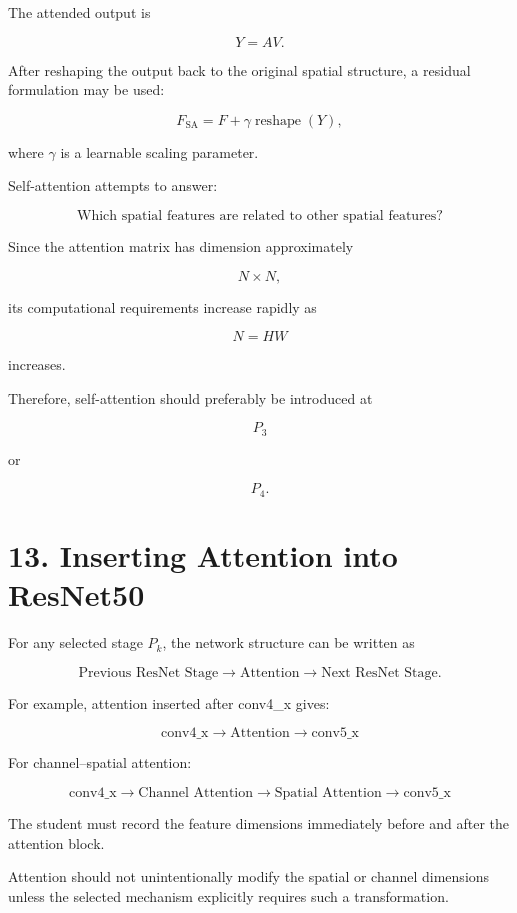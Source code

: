 \documentclass[10pt]{article}
\begin{document}
The attended output is

\[
Y=AV.
\]

After reshaping the output back to the original spatial structure, a residual
formulation may be used:

\[
F_{\mathrm{SA}}
=
F
+
\gamma
\operatorname{reshape}(Y),
\]

where $\gamma$ is a learnable scaling parameter.

Self-attention attempts to answer:

\[
\boxed{
\text{Which spatial features are related to other spatial features?}
}
\]

Since the attention matrix has dimension approximately

\[
N\times N,
\]

its computational requirements increase rapidly as

\[
N=HW
\]

increases.

Therefore, self-attention should preferably be introduced at

\[
P_3
\]

or

\[
P_4.
\]

\section*{13. Inserting Attention into ResNet50}

For any selected stage $P_k$, the network structure can be written as

\[
\text{Previous ResNet Stage}
\rightarrow
\text{Attention}
\rightarrow
\text{Next ResNet Stage}.
\]

For example, attention inserted after conv4\_x gives:

\[
\boxed{
\text{conv4\_x}
\rightarrow
\text{Attention}
\rightarrow
\text{conv5\_x}
}
\]

For channel--spatial attention:

\[
\boxed{
\text{conv4\_x}
\rightarrow
\text{Channel Attention}
\rightarrow
\text{Spatial Attention}
\rightarrow
\text{conv5\_x}
}
\]

The student must record the feature dimensions immediately before and after
the attention block.

Attention should not unintentionally modify the spatial or channel
dimensions unless the selected mechanism explicitly requires such a
transformation.
\end{document}
